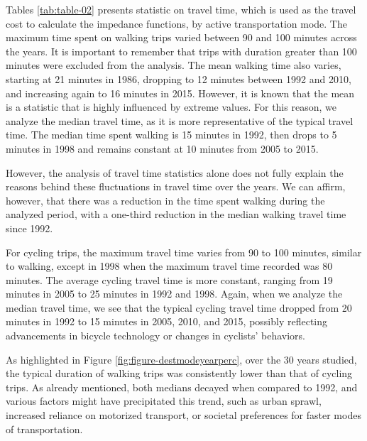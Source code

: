 \documentclass[preprint, 3p,
authoryear]{elsarticle} %
\begin{document}
Tables \ref{tab:table-02} presents statistic on travel time, which is
used as the travel cost to calculate the impedance functions, by active
transportation mode. The maximum time spent on walking trips varied
between 90 and 100 minutes across the years. It is important to remember
that trips with duration greater than 100 minutes were excluded from the
analysis. The mean walking time also varies, starting at 21 minutes in
1986, dropping to 12 minutes between 1992 and 2010, and increasing again
to 16 minutes in 2015. However, it is known that the mean is a statistic
that is highly influenced by extreme values. For this reason, we analyze
the median travel time, as it is more representative of the typical
travel time. The median time spent walking is 15 minutes in 1992, then
drops to 5 minutes in 1998 and remains constant at 10 minutes from 2005
to 2015.

However, the analysis of travel time statistics alone does not fully
explain the reasons behind these fluctuations in travel time over the
years. We can affirm, however, that there was a reduction in the time
spent walking during the analyzed period, with a one-third reduction in
the median walking travel time since 1992.

For cycling trips, the maximum travel time varies from 90 to 100
minutes, similar to walking, except in 1998 when the maximum travel time
recorded was 80 minutes. The average cycling travel time is more
constant, ranging from 19 minutes in 2005 to 25 minutes in 1992 and
1998. Again, when we analyze the median travel time, we see that the
typical cycling travel time dropped from 20 minutes in 1992 to 15
minutes in 2005, 2010, and 2015, possibly reflecting advancements in
bicycle technology or changes in cyclists' behaviors.

As highlighted in Figure \ref{fig:figure-destmodeyearperc}, over the 30
years studied, the typical duration of walking trips was consistently
lower than that of cycling trips. As already mentioned, both medians
decayed when compared to 1992, and various factors might have
precipitated this trend, such as urban sprawl, increased reliance on
motorized transport, or societal preferences for faster modes of
transportation.

\begingroup\fontsize{10}{12}\selectfont
\end{document}
